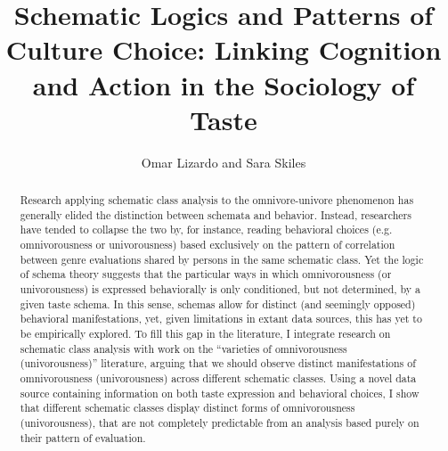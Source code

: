 \documentclass[preprint,12pt]{elsarticle}
\begin{document}
\begin{frontmatter}


\title{Schematic Logics and Patterns of Culture Choice: Linking Cognition and Action in the Sociology of Taste}




\author{Omar Lizardo and Sara Skiles}

\address{University of Notre Dame}

\begin{abstract}
Research applying schematic class analysis to the omnivore-univore phenomenon has generally elided the distinction between schemata and behavior. Instead, researchers have tended to collapse the two by, for instance, reading behavioral choices (e.g. omnivorousness or univorousness) based exclusively on the pattern of correlation between genre evaluations shared by persons in the same schematic class. Yet the logic of schema theory suggests that the particular ways in which omnivorousness (or univorousness) is expressed behaviorally is only conditioned, but not determined, by a given taste schema. In this sense, schemas allow for distinct (and seemingly opposed) behavioral manifestations, yet, given limitations in extant data sources, this has yet to be empirically explored. To fill this gap in the literature, I integrate research on schematic class analysis with work on the ``varieties of omnivorousness (univorousness)'' literature, arguing that we should observe distinct manifestations of omnivorousness (univorousness) across different schematic classes. Using a novel data source containing information on both taste expression and behavioral choices, I show that different schematic classes display distinct forms of omnivorousness (univorousness), that are not completely predictable from an analysis based purely on their pattern of evaluation.
\end{abstract}


\end{frontmatter}
\end{document}
